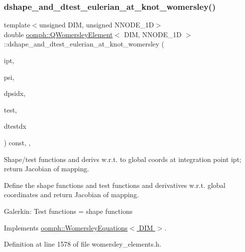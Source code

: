 \subsubsection{\texorpdfstring{dshape\+\_\+and\+\_\+dtest\+\_\+eulerian\+\_\+at\+\_\+knot\+\_\+womersley()}{dshape\_and\_dtest\_eulerian\_at\_knot\_womersley()}}
{\footnotesize\ttfamily template$<$unsigned D\+IM, unsigned N\+N\+O\+D\+E\+\_\+1D$>$ \\
double \hyperlink{classoomph_1_1QWomersleyElement}{oomph\+::\+Q\+Womersley\+Element}$<$ D\+IM, N\+N\+O\+D\+E\+\_\+1D $>$\+::dshape\+\_\+and\+\_\+dtest\+\_\+eulerian\+\_\+at\+\_\+knot\+\_\+womersley (\begin{DoxyParamCaption}\item[{const unsigned \&}]{ipt,  }\item[{\hyperlink{classoomph_1_1Shape}{Shape} \&}]{psi,  }\item[{\hyperlink{classoomph_1_1DShape}{D\+Shape} \&}]{dpsidx,  }\item[{\hyperlink{classoomph_1_1Shape}{Shape} \&}]{test,  }\item[{\hyperlink{classoomph_1_1DShape}{D\+Shape} \&}]{dtestdx }\end{DoxyParamCaption}) const\hspace{0.3cm}{\ttfamily [inline]}, {\ttfamily [protected]}, {\ttfamily [virtual]}}



Shape/test functions and derivs w.\+r.\+t. to global coords at integration point ipt; return Jacobian of mapping. 

Define the shape functions and test functions and derivatives w.\+r.\+t. global coordinates and return Jacobian of mapping.

Galerkin\+: Test functions = shape functions 

Implements \hyperlink{classoomph_1_1WomersleyEquations_a5f8bd506dbebc304f30f86ef4acfbd9d}{oomph\+::\+Womersley\+Equations$<$ D\+I\+M $>$}.



Definition at line 1578 of file womersley\+\_\+elements.\+h.

\mbox{\label{classoomph_1_1QWomersleyElement_afe507e9f0d7359d47c0c682fed7c952b}} 
